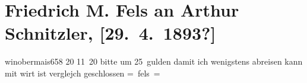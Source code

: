 

         
         \renewcommand{\erwaehntePersonen}{Personen: Josef Drassl, Friedrich Michael Fels}
         \renewcommand{\erwaehnteOrte}{Orte: Meran, Obermais, Wien}
         \renewcommand{\erwaehnteWerke}{}
               \section[Friedrich M. Fels an Arthur Schnitzler, {[}29. 4. 1893?{]}]{ Friedrich M. Fels an Arthur Schnitzler, {[}29. 4. 1893?{]}}\nopagebreak{}\rehead{ }\begin{ledgroupsized}[t]{13cm}\normalsize\beginnumbering \toendnotes[C]{\smallbreak\pagebreak[2]} 
\toendnotes[C]{\smallbreak}\pstart
           {\pb}winobermais658{ }20{ }11 20\pend
           \pstart
           bitte um 25 gulden damit ich wenigstens abreisen kann mit wirt ist verglejch geschlossen \pend
           \pstart \spacefill\mbox{= fels =}\pend{}
         
         \endnumbering{}\end{ledgroupsized}  \newcommand{\dateiname}{L00203}\newcommand{\titel}{Friedrich M. Fels an Arthur Schnitzler, [29. 4. 1893?]}\newcommand{\editorInnen}{Martin Anton Müller und Gerd-Hermann Susen}
      